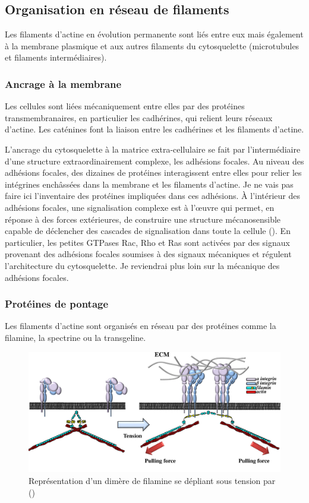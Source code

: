 \subsection{Organisation en réseau de filaments}

Les filaments d'actine en évolution permanente sont liés entre eux mais également à la membrane plasmique et aux autres filaments du cytosquelette (microtubules et filaments intermédiaires). 


\subsubsection{Ancrage à la membrane}

Les cellules sont liées mécaniquement entre elles par des protéines transmembranaires, en particulier les cadhérines, qui relient leurs réseaux d'actine. Les caténines font la liaison entre les cadhérines et les filaments d'actine. 

L'ancrage du cytosquelette à la matrice extra-cellulaire se fait par l'intermédiaire d'une structure extraordinairement complexe, les adhésions focales. 
Au niveau des adhésions focales, des dizaines de protéines interagissent entre elles pour relier les intégrines enchâssées dans la membrane et les filaments d'actine. 
Je ne vais pas faire ici l'inventaire des protéines impliquées dans ces adhésions. 
À l'intérieur des adhésions focales, une signalisation complexe est à l'\oe uvre qui permet, en réponse à des forces extérieures, de construire une structure mécanosensible capable de déclencher des cascades de signalisation dans toute la cellule (\cite{geiger_environmental_2009}). 
En particulier, les petites GTPases Rac, Rho et Ras sont activées par des signaux provenant des adhésions focales soumises à des signaux mécaniques et régulent l'architecture du cytosquelette.
Je reviendrai plus loin sur la mécanique des adhésions focales.  

\subsubsection{Protéines de pontage}

Les filaments d'actine sont organisés en réseau par des protéines comme la filamine, la spectrine ou la transgeline. 

\begin{figure}
\includegraphics[scale=0.25]{Figures/filamine.png} 
\caption{Représentation d'un dimère de filamine se dépliant sous tension par (\cite{janostiak_mechanosensors_2014}) \label{filamine}}
\end{figure}

